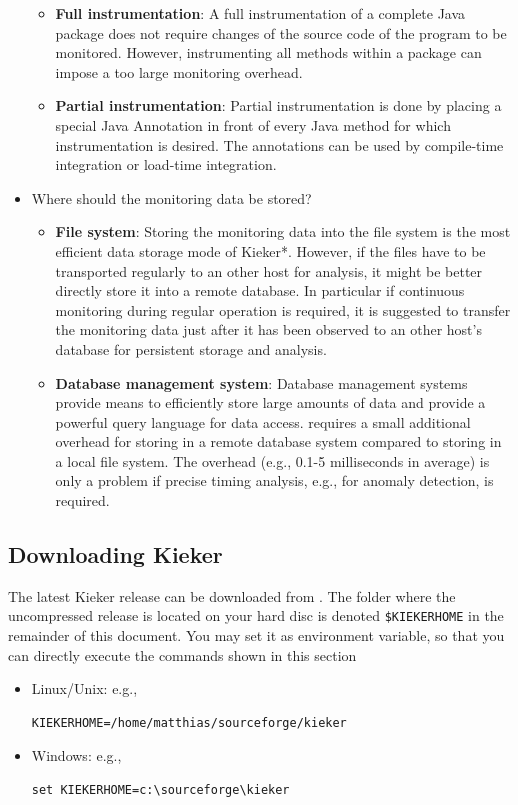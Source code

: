 \documentclass[a4paper,12pt]{scrartcl}
\begin{document}
\begin{itemize}
\begin{itemize}
\item \textbf{Full instrumentation}: A full instrumentation of a complete Java package does not require changes of the source code of the program to be monitored. However, instrumenting all methods within a package can impose a too large monitoring overhead.
\item \textbf{Partial instrumentation}: Partial instrumentation is done by placing a special Java Annotation in front of every Java method for which instrumentation is desired. The annotations can be used by compile-time integration or load-time integration.
\end{itemize}
\item Where should the monitoring data be stored?
\begin{itemize}
\item \textbf{File system}: Storing the monitoring data into the file system is the most efficient data storage mode of Kieker*. However, if the files have to be transported regularly to an other host for analysis, it might be better directly store it into a remote database. In particular if continuous monitoring during regular operation is required, it is suggested to transfer the monitoring data just after it has been observed to an other host's database for persistent storage and analysis.
\item \textbf{Database management system}: Database management systems provide means to efficiently store large amounts of data and provide a powerful query language for data access. \tpmon{} requires a small additional overhead for storing in a remote database system compared to storing in a local file system. The overhead (e.g., 0.1-5 milliseconds in average) is only a problem if precise timing analysis, e.g., for anomaly detection, is required. %
\end{itemize}
\end{itemize}

\subsection{Downloading Kieker}
The latest Kieker release can be downloaded from \kiekerurl{}. The folder where the uncompressed release is located on your hard disc is denoted \texttt{\$KIEKERHOME} in the remainder of this document. You may set it as environment variable, so that you can directly execute the commands shown in this section
\begin{itemize}
 \item Linux/Unix: e.g.,
\begin{lstlisting}[caption={}]
KIEKERHOME=/home/matthias/sourceforge/kieker
\end{lstlisting}
\item Windows: e.g.,
\begin{lstlisting}[caption={}]
set KIEKERHOME=c:\sourceforge\kieker
\end{lstlisting}
\end{itemize}
\end{document}
